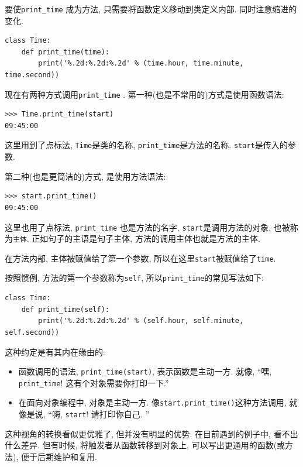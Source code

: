 \documentclass[10pt]{book}
\begin{document}
要使\verb"print_time" 成为方法, 只需要将函数定义移动到类定义内部. 
同时注意缩进的变化. 

\begin{verbatim}
class Time:
    def print_time(time):
        print('%.2d:%.2d:%.2d' % (time.hour, time.minute, time.second))
\end{verbatim}
%
现在有两种方式调用\verb"print_time" . 
第一种(也是不常用的)方式是使用函数语法:

\begin{verbatim}
>>> Time.print_time(start)
09:45:00
\end{verbatim}
%
这里用到了点标法, {\tt Time}是类的名称, 
\verb"print_time"是方法的名称. 
{\tt start}是传入的参数. 

第二种(也是更简洁的)方式, 是使用方法语法:

\begin{verbatim}
>>> start.print_time()
09:45:00
\end{verbatim}
%
这里也用了点标法, \verb"print_time" 也是方法的名字, {\tt start}是调用方法的对象, 
也被称为{\tt 主体}. 
正如句子的主语是句子主体, 方法的调用主体也就是方法的主体. 

在方法内部, 主体被赋值给了第一个参数, 所以在这里{\tt start}被赋值给了{\tt time}.

按照惯例, 方法的第一个参数称为{\tt self}, 所以\verb"print_time"的常见写法如下:

\begin{verbatim}
class Time:
    def print_time(self):
        print('%.2d:%.2d:%.2d' % (self.hour, self.minute, self.second))
\end{verbatim}
%

这种约定是有其内在缘由的:

\begin{itemize}

\item 函数调用的语法, \verb"print_time(start)",  表示函数是主动一方. 
就像, ``嘿, \verb"print_time"!  这有个对象需要你打印一下.''

\item 在面向对象编程中, 对象是主动一方. 像\verb"start.print_time()"这种方法调用, 
就像是说, ``嗨, {\tt start}! 请打印你自己. ''

\end{itemize}

这种视角的转换看似更优雅了, 但并没有明显的优势. 
在目前遇到的例子中, 看不出什么差异. 
但有时候, 将触发者从函数转移到对象上, 
可以写出更通用的函数(或方法), 便于后期维护和复用. 
\end{document}
